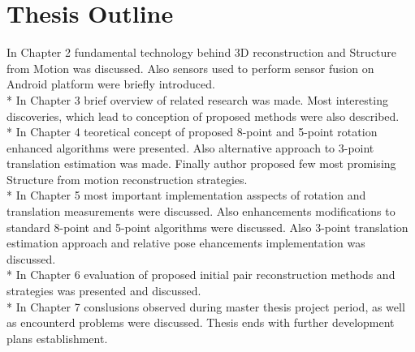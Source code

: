 \section{Thesis Outline}
In Chapter 2 fundamental technology behind 3D reconstruction and Structure from Motion was discussed. Also sensors used to perform sensor fusion on Android platform were briefly introduced.
\\*
In Chapter 3 brief overview of related research was made. Most interesting discoveries, which lead to conception of proposed methods were also described. 
\\*
In Chapter 4 teoretical concept of proposed 8-point and 5-point rotation enhanced algorithms were presented. Also alternative approach to 3-point translation estimation was made. Finally author proposed few most promising Structure from motion reconstruction strategies.
\\*
In Chapter 5 most important implementation asspects of rotation and translation measurements were discussed. Also enhancements modifications to standard 8-point and 5-point algorithms were discussed. Also 3-point translation estimation approach and relative pose ehancements implementation was discussed.
\\*
In Chapter 6 evaluation of proposed initial pair reconstruction methods and strategies was presented and discussed.
\\*
In Chapter 7 conslusions observed during master thesis project period, as well as encounterd problems were discussed. Thesis ends with further development plans establishment.




